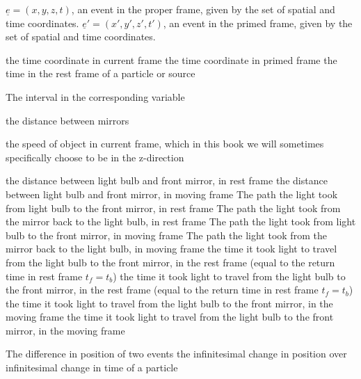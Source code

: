 {$\underline{e}=(x,y,z,t)$, an event in the proper frame, given by the set of spatial and time coordinates.}
{$\underline{e}'=(x',y',z',t')$, an event in the primed frame, given by the set of spatial and time coordinates.}

{the time coordinate in current frame}
{the time coordinate in primed frame}
{the time in the rest frame of a particle or source}


\variableterm{\TDelta}{\Delta}
{The interval in the corresponding variable}


{the distance between mirrors}


{the speed of object in current frame, which in this book we will sometimes specifically choose to be in the z-direction}


{the distance between light bulb and front mirror, in rest frame}
{the distance between light bulb and front mirror, in moving frame}
{The path the light took from light bulb to the front mirror, in rest frame}
{The path the light took from the mirror back to the light bulb, in rest frame}
{The path the light took from light bulb to the front mirror, in moving frame}
{The path the light took from the mirror back to the light bulb, in moving frame}
{the time it took light to travel from the light bulb to the front mirror, in the rest frame (equal to the return time in rest frame $t_f=t_b$)}
{the time it took light to travel from the light bulb to the front mirror, in the rest frame (equal to the return time in rest frame $t_f=t_b$)}
{the time it took light to travel from the light bulb to the front mirror, in the moving frame}
{the time it took light to travel from the light bulb to the front mirror, in the moving frame}




{The difference in position of two events}
{the infinitesimal change in position over infinitesimal change in time of a particle}

